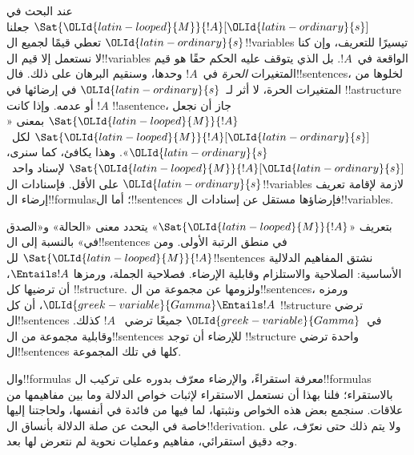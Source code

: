 \documentclass[../../../include/open-logic-section]{subfiles}
\begin{document}


عند البحث في $\Sat{{\OLId{latin-looped}{M}}}{!A}[{\OLId{latin-ordinary}{s}}]$ جعلنا ${\OLId{latin-ordinary}{s}}$ تعطي قيمًا لجميع
ال!!{variable}s تيسيرًا للتعريف، وإن كنا لا نستعمل إلا قيم
ال!!{variable}s الواقعة في~$!A$. بل الذي يتوقف عليه الحكم حقًا
هو قيم المتغيرات \emph{الحرة} في~$!A$ وحدها، وسنقيم البرهان على
ذلك. فال!!{sentence}s، لخلوها من المتغيرات الحرة، لا أثر
لـ~${\OLId{latin-ordinary}{s}}$ في إرضائها في !!a{structure} أو عدمه. وإذا كانت $!A$
!!a{sentence}، جاز أن نجعل $\Sat{{\OLId{latin-looped}{M}}}{!A}$ بمعنى
«$\Sat{{\OLId{latin-looped}{M}}}{!A}[{\OLId{latin-ordinary}{s}}]$ لكل~${\OLId{latin-ordinary}{s}}$». وهذا يكافئ، كما سنرى،
$\Sat{{\OLId{latin-looped}{M}}}{!A}[{\OLId{latin-ordinary}{s}}]$ لإسناد واحد~${\OLId{latin-ordinary}{s}}$ على الأقل. فإسنادات
ال!!{variable}s لازمة لإقامة تعريف إرضاء ال!!{formula}s؛ أما
ال!!{sentence}s فإرضاؤها مستقل عن إسنادات ال!!{variable}s.

بتعريف «$\Sat{{\OLId{latin-looped}{M}}}{!A}$» يتحدد معنى «الحالة» و«الصدق في» بالنسبة
إلى ال!!{sentence}s في منطق الرتبة الأولى. ومن
$\Sat{{\OLId{latin-looped}{M}}}{!A}$ لل!!{sentence}s نشتق المفاهيم الدلالية الأساسية:
الصلاحية والاستلزام وقابلية الإرضاء. فصلاحية الجملة، ورمزها
$\Entails !A$، أن ترضيها كل !!{structure}. ولزومها عن
مجموعة من ال!!{sentence}s، ورمزه ${\OLId{greek-variable}{Gamma}} \Entails !A$، أن كل
!!{structure} ترضي ال!!{sentence}s في~${\OLId{greek-variable}{Gamma}}$ جميعًا ترضي
~$!A$ كذلك. وقابلية مجموعة من ال!!{sentence}s للإرضاء أن توجد
!!{structure} واحدة ترضي ال!!{sentence}s كلها في تلك المجموعة.

وال!!{formula}s معرفة استقراءً، والإرضاء معرّف بدوره على تركيب
ال!!{formula}s بالاستقراء؛ فلنا بهذا أن نستعمل الاستقراء لإثبات
خواص الدلالة وما بين مفاهيمها من علاقات. سنجمع بعض هذه الخواص
ونثبتها، لما فيها من فائدة في أنفسها، ولحاجتنا إليها خاصة في
البحث عن صلة الدلالة بأنساق ال!!{derivation}. ولا يتم ذلك حتى
نعرّف، على وجه دقيق استقرائي، مفاهيم وعمليات نحوية لم نتعرض لها
بعد.
\end{document}
